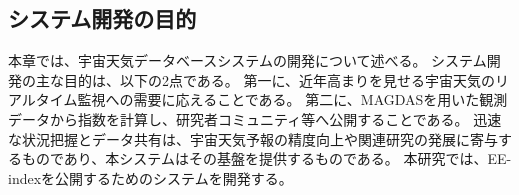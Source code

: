 \subsection{システム開発の目的}
本章では、宇宙天気データベースシステムの開発について述べる。
システム開発の主な目的は、以下の2点である。
第一に、近年高まりを見せる宇宙天気のリアルタイム監視への需要に応えることである。
第二に、MAGDASを用いた観測データから指数を計算し、研究者コミュニティ等へ公開することである。
迅速な状況把握とデータ共有は、宇宙天気予報の精度向上や関連研究の発展に寄与するものであり、本システムはその基盤を提供するものである。
本研究では、EE-indexを公開するためのシステムを開発する。
